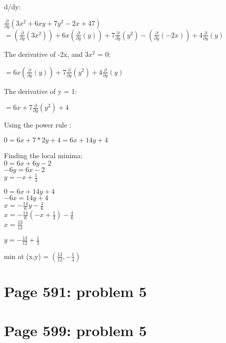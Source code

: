 \documentclass[]{article}
\begin{document}
d/dy:

\(\frac{\partial}{\partial y}(3x^2 + 6xy + 7y^2 - 2x + 47)\)\\
\(= (\frac{\partial}{\partial y}(3x^2)) + 6x(\frac{\partial}{\partial y}(y)) + 7\frac{\partial}{\partial y}(y^2) - (\frac{\partial}{\partial y}(-2x)) + 4\frac{\partial}{\partial y}(y)\)

The derivative of -2x, and \(3x^2\) = 0:

\(= 6x(\frac{\partial}{\partial y}(y)) + 7\frac{\partial}{\partial y}(y^2) + 4\frac{\partial}{\partial y}(y)\)

The derivative of y = 1:

\(= 6x + 7\frac{\partial}{\partial y}(y^2) + 4\)

Using the power rule :

\(0 = 6x + 7*2y + 4 = 6x + 14y + 4\)

Finding the local minima:\\
\(0 = 6x + 6y -2\)\\
\(-6y = 6x - 2\)\\
\(y = -x + \frac{1}{3}\)

\(0 = 6x + 14y + 4\)\\
\(-6x = 14y + 4\)\\
\(x = -\frac{14}{6}y - \frac{4}{6}\)\\
\(x = -\frac{14}{6}(-x + \frac{1}{3}) - \frac{4}{6}\)\\
\(x = \frac{13}{12}\)

\(y = - \frac{13}{12} + \frac{1}{3}\)

min at (x,y) = \((\frac{13}{12}, -\frac{1}{4})\)

\section{Page 591: problem 5}\label{page-591-problem-5}

\section{Page 599: problem 5}\label{page-599-problem-5}
\end{document}
